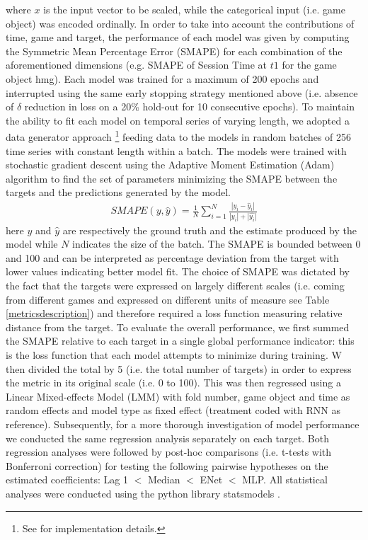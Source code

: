where $x$ is the input vector to be scaled, while the categorical input (i.e. game object) was encoded ordinally. In order to take into account the contributions of time, game and target, the performance of each model was given by computing the Symmetric Mean Percentage Error (SMAPE) \cite{zhu2017deep} for each combination of the aforementioned dimensions (e.g. SMAPE of Session Time at $t1$ for the game object hmg). Each model was trained for a maximum of 200 epochs and interrupted using the same early stopping strategy mentioned above (i.e. absence of $\delta$ reduction in loss on a 20\% hold-out for 10 consecutive epochs). To maintain the ability to fit each model on temporal series of varying length, we adopted a data generator approach \footnote{See \cite{chollet2015keras,tensorflow2015-whitepaper} for implementation details.} feeding data to the models in random batches of 256 time series with constant length within a batch. The models were trained with stochastic gradient descent using the Adaptive Moment Estimation (Adam) \cite{kingma2014adam} algorithm to find the set of parameters minimizing the SMAPE between the targets and the predictions generated by the model. 
\begin{equation}
  \begin{gathered} 
  \label{smape}
     SMAPE(y, \widehat{y}) = 
    \frac{1}{N} 
    \sum_{i=1}^{N}
    \frac{| y_{i} - \widehat{y}_{i} |} {|y_{i}| + |\widehat{y_{i}}|}  
  \end{gathered}
\end{equation}
here $y$ and $\widehat{y}$ are respectively the ground truth and the estimate produced by the model while $N$ indicates the size of the batch. The SMAPE is bounded between 0 and 100 and can be interpreted as percentage deviation from the target with lower values indicating better model fit. The choice of SMAPE was dictated by the fact that the targets were expressed on largely different scales (i.e. coming from different games and expressed on different units of measure see Table \ref{metricsdescription}) and therefore required a loss function measuring relative distance from the target. To evaluate the overall performance, we first summed the SMAPE relative to each target in a single global performance indicator: this is the loss function that each model attempts to minimize during training. W then divided the total by 5 (i.e. the total number of targets) in order to express the metric in its original scale (i.e. 0 to 100). This was then regressed using a Linear Mixed-effects Model (LMM) with fold number, game object and time as random effects and model type as fixed effect (treatment coded with RNN as reference). Subsequently, for a more thorough investigation of model performance we conducted the same regression analysis separately on each target. Both regression analyses were followed by post-hoc comparisons (i.e. t-tests with Bonferroni correction) for testing the following pairwise hypotheses on the estimated coefficients: Lag 1 $<$ Median $<$ ENet $<$ MLP. All statistical analyses were conducted using the python library statsmodels \cite{seabold2010statsmodels}. 

